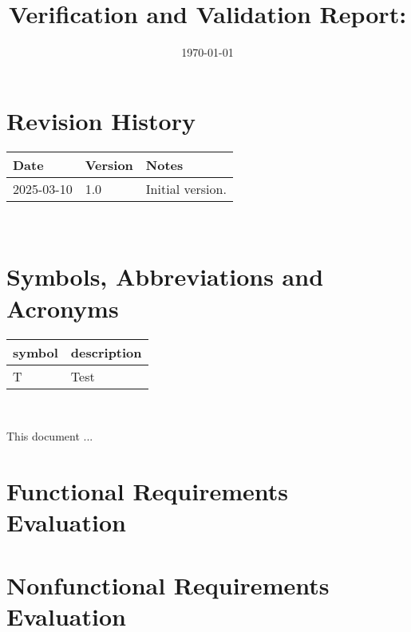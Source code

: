 \documentclass[12pt, titlepage]{article}
\begin{document}
\title{Verification and Validation Report: \progname} 
\author{\authname}
\date{\today}
	
\maketitle


\section{Revision History}

\begin{tabularx}{\textwidth}{p{3cm}p{2cm}X}
\toprule {\bf Date} & {\bf Version} & {\bf Notes}\\
\midrule
2025-03-10 & 1.0 & Initial version.\\
\bottomrule
\end{tabularx}

~\newpage

\section{Symbols, Abbreviations and Acronyms}

\renewcommand{\arraystretch}{1.2}
\begin{tabular}{l l} 
  \toprule		
  \textbf{symbol} & \textbf{description}\\
  \midrule 
  T & Test\\
  \bottomrule
\end{tabular}\\


\newpage

\tableofcontents

\listoftables %

\listoffigures %

\newpage


This document ...

\section{Functional Requirements Evaluation}

\section{Nonfunctional Requirements Evaluation}
\end{document}
